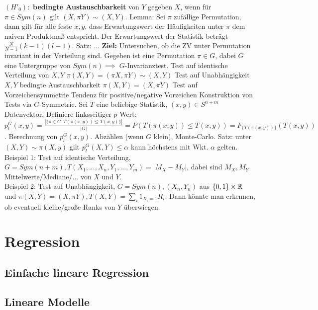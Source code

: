 \begin{outline}
    \1 $(H'_0):$ \textbf{bedingte Austauschbarkeit} von $Y$ gegeben $X$, wenn für $\pi\in Sym(n)$ gilt $(X,\pi Y)\sim (X,Y)$.
    \1 Lemma: Sei $\pi$ zufällige Permutation, dann gilt für alle feste $x,y$, dass Erwartungswert der Häufigkeiten unter $\pi$ dem naiven Produktmaß entspricht. Der Erwartungswert der Statistik beträgt $\frac{N}{N-1}(k-1)(l-1)$.
    \1 Satz: $\ldots$
\0 \textbf{Ziel:} Untersuchen, ob die ZV unter Permutation invariant in der Verteilung sind. Gegeben ist eine Permutation $\pi\in G$, dabei $G$ eine Untergruppe von $Sym(n) \implies$ $G$-Invarianztest.
    \1 Test auf identische Verteilung von $X,Y$
        \2 $\pi(X,Y) = (\pi X, \pi Y)\sim (X,Y)$
    \1 Test auf Unabhängigkeit $X,Y$
        \2 bedingte Austauschbarkeit $\pi(X,Y)=(X,\pi Y)$
    \1 Test auf Vorzeichensymmetrie 
        \2 Tendenz für positive/negative Vorzeichen
\0 Konstruktion von Tests via $G$-Symmetrie. Sei $T$ eine beliebige Statistik, $(x,y)\in S^{n+m}$ Datenvektor. Definiere 
    \1 linksseitiger $p$-Wert: $p_l^G(x,y) = \frac{|\{\pi \in G: T(\pi(x,y))\leq T(x,y)\}|}{|G|}=P(T(\pi(x,y)) \leq T(x,y))=F_{\{T(\pi(x,y))\}} (T(x,y))$.
    \1 Berechnung von $p_l^G(x,y)$. Abzählen (wenn $G$ klein), Monte-Carlo.
    \1 Satz: unter $(X,Y)\sim \pi(X,y)$ gilt $p_l^G(X,Y)\leq \alpha$ kann höchstens mit Wkt. $\alpha$ gelten.
\0 Beispiel 1: Test auf identische Verteilung, $G=Sym(n+m), T(X_1,...,X_n,Y_1,...,Y_m)=|M_X-M_Y|$, dabei sind $M_X,M_Y$ Mittelwerte/Mediane/... von $X$ und $Y$.\\
\0 Beispiel 2: Test auf Unabhängigkeit, $G=Sym(n), (X_n,Y_n)$ aus $\{0,1\}\times \mathbb{R} $ und $\pi(X,Y)=(X,\pi Y), T(X,Y)=\sum_i 1_{X_i=1} R_i$. Dann könnte man erkennen, ob eventuell kleine/große Ranks von $Y$ überwiegen.
\end{outline}

\section{Regression}

\subsection{Einfache lineare Regression}

\subsection{Lineare Modelle}


